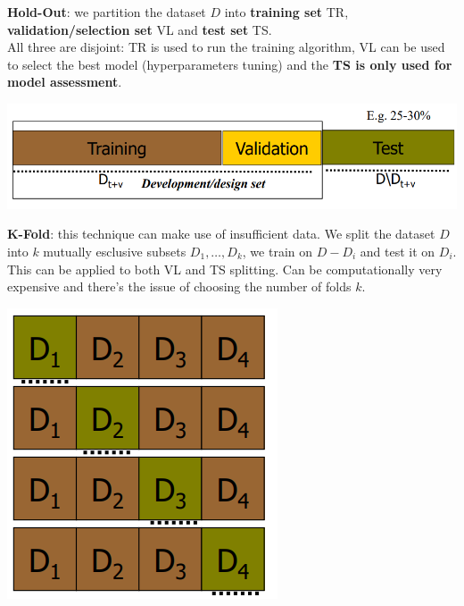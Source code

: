 \documentclass[10pt]{report}
\begin{document}
\begin{list}{}{}
	\item \textbf{Hold-Out}: we partition the dataset $D$ into \textbf{training set} TR, \textbf{validation/selection set} VL and \textbf{test set} TS.\\
	All three are disjoint: TR is used to run the training algorithm, VL can be used to select the best model (hyperparameters tuning) and the \textbf{TS is only used for model assessment}.
	\begin{center}
		\includegraphics[scale=0.5]{2.png}
	\end{center}
	\item \begin{multicols}{2}
	\textbf{K-Fold}: this technique can make use of insufficient data. We split the dataset $D$ into $k$ mutually esclusive subsets $D_1,\ldots, D_k$, we train on $D - D_i$ and test it on $D_i$.\\
	This can be applied to both VL and TS splitting. Can be computationally very expensive and there's the issue of choosing the number of folds $k$.
	\begin{center}
		\includegraphics[scale=0.5]{3.png}
	\end{center}
	\end{multicols}
\end{list}
\end{document}
